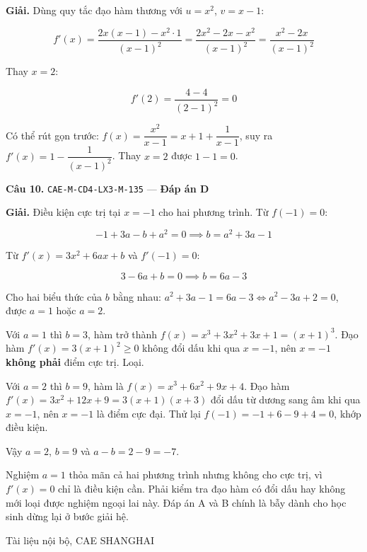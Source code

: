 \documentclass[11pt, a4paper]{article}
\begin{document}
\textbf{Giải.} Dùng quy tắc đạo hàm thương với $u = x^2$, $v = x - 1$:

$$f'(x) = \frac{2x(x-1) - x^2 \cdot 1}{(x-1)^2} = \frac{2x^2 - 2x - x^2}{(x-1)^2} = \frac{x^2 - 2x}{(x-1)^2}$$

Thay $x = 2$:

$$f'(2) = \frac{4 - 4}{(2-1)^2} = 0$$

 Có thể rút gọn trước: $f(x) = \dfrac{x^2}{x-1} = x + 1 + \dfrac{1}{x-1}$, suy ra $f'(x) = 1 - \dfrac{1}{(x-1)^2}$. Thay $x = 2$ được $1 - 1 = 0$.

\textbf{Câu 10.} \texttt{CAE-M-CD4-LX3-M-135} — \textbf{Đáp án D}

\textbf{Giải.} Điều kiện cực trị tại $x = -1$ cho hai phương trình. Từ $f(-1) = 0$:

$$-1 + 3a - b + a^2 = 0 \implies b = a^2 + 3a - 1$$

Từ $f'(x) = 3x^2 + 6ax + b$ và $f'(-1) = 0$:

$$3 - 6a + b = 0 \implies b = 6a - 3$$

Cho hai biểu thức của $b$ bằng nhau: $a^2 + 3a - 1 = 6a - 3 \iff a^2 - 3a + 2 = 0$, được $a = 1$ hoặc $a = 2$.

Với $a = 1$ thì $b = 3$, hàm trở thành $f(x) = x^3 + 3x^2 + 3x + 1 = (x+1)^3$. Đạo hàm $f'(x) = 3(x+1)^2 \ge 0$ không đổi dấu khi qua $x = -1$, nên $x = -1$ \textbf{không phải} điểm cực trị. Loại.

Với $a = 2$ thì $b = 9$, hàm là $f(x) = x^3 + 6x^2 + 9x + 4$. Đạo hàm $f'(x) = 3x^2 + 12x + 9 = 3(x+1)(x+3)$ đổi dấu từ dương sang âm khi qua $x = -1$, nên $x = -1$ là điểm cực đại. Thử lại $f(-1) = -1 + 6 - 9 + 4 = 0$, khớp điều kiện.

Vậy $a = 2$, $b = 9$ và $a - b = 2 - 9 = -7$.

 Nghiệm $a = 1$ thỏa mãn cả hai phương trình nhưng không cho cực trị, vì $f'(x) = 0$ chỉ là điều kiện cần. Phải kiểm tra đạo hàm có đổi dấu hay không mới loại được nghiệm ngoại lai này. Đáp án A và B chính là bẫy dành cho học sinh dừng lại ở bước giải hệ.
\vspace{0.8cm}
\begin{center}
{\footnotesize\color{cae_blue} Tài liệu nội bộ, CAE SHANGHAI}
\end{center}
\end{document}
